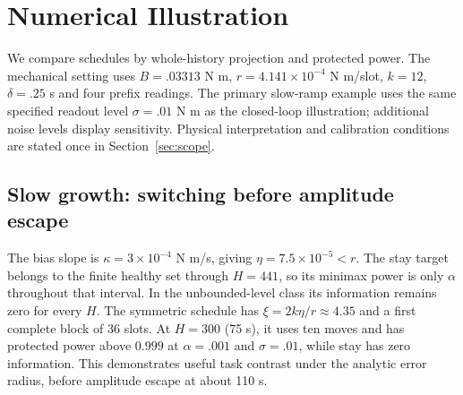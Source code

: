 \section{Numerical Illustration}
We compare schedules by whole-history projection and protected power. The mechanical setting uses $B=.03313$ N m, $r=4.141\times10^{-4}$ N m/slot, $k=12$, $\delta=.25$ s and four prefix readings. The primary slow-ramp example uses the same specified readout level $\sigma=.01$ N m as the closed-loop illustration; additional noise levels display sensitivity. Physical interpretation and calibration conditions are stated once in Section~\ref{sec:scope}.

\subsection{Slow growth: switching before amplitude escape}\label{sec:slow}
The bias slope is $\kappa=3\times10^{-4}$ N m/s, giving $\eta=7.5\times10^{-5}<r$. The stay target belongs to the finite healthy set through $H=441$, so its minimax power is only $\alpha$ throughout that interval. In the unbounded-level class its information remains zero for every $H$. The symmetric schedule has $\xi=2k\eta/r\approx4.35$ and a first complete block of 36 slots. At $H=300$ (75 s), it uses ten moves and has protected power above $0.999$ at $\alpha=.001$ and $\sigma=.01$, while stay has zero information. This demonstrates useful task contrast under the analytic error radius, before amplitude escape at about 110 s.

